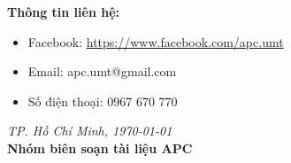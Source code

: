 \vspace{0.5cm}

\textbf{Thông tin liên hệ:}
\begin{itemize}
    \item Facebook: \url{https://www.facebook.com/apc.umt}
    \item Email: apc.umt@gmail.com
    \item Số điện thoại: 0967 670 770
\end{itemize}

\vspace{1cm}
\begin{flushright}
\textit{TP. Hồ Chí Minh, \today} \\[0.3cm]
\textbf{Nhóm biên soạn tài liệu APC}
\end{flushright}
